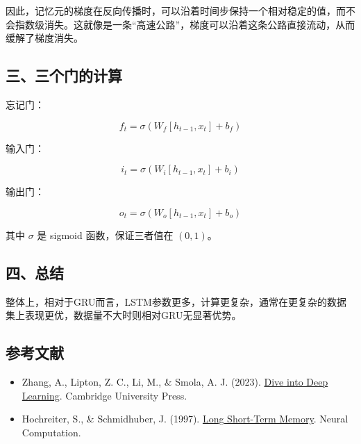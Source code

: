 因此，记忆元的梯度在反向传播时，可以沿着时间步保持一个相对稳定的值，而不会指数级消失。这就像是一条``高速公路''，梯度可以沿着这条公路直接流动，从而缓解了梯度消失。

\hypertarget{ux4e09ux4e09ux4e2aux95e8ux7684ux8ba1ux7b97}{%
\subsection{三、三个门的计算}\label{ux4e09ux4e09ux4e2aux95e8ux7684ux8ba1ux7b97}}

忘记门：

\[
f_t = \sigma(W_f [h_{t-1}, x_t] + b_f)
\]

输入门：

\[
i_t = \sigma(W_i [h_{t-1}, x_t] + b_i)
\]

输出门：

\[
o_t = \sigma(W_o [h_{t-1}, x_t] + b_o)
\]

其中 \(\sigma\) 是 sigmoid 函数，保证三者值在 \((0,1)\)。

\hypertarget{ux56dbux603bux7ed3}{%
\subsection{四、总结}\label{ux56dbux603bux7ed3}}

整体上，相对于GRU而言，LSTM参数更多，计算更复杂，通常在更复杂的数据集上表现更优，数据量不大时则相对GRU无显著优势。

\FloatBarrier
{}
\hypertarget{ux53c2ux8003ux6587ux732e-21}{%
\subsection{参考文献}\label{ux53c2ux8003ux6587ux732e-21}}

\vspace{0.25em}
\begin{itemize}
\tightlist
\item
  Zhang, A., Lipton, Z. C., Li, M., \& Smola, A. J. (2023). \href{https://D2L.ai}{Dive into Deep Learning}. Cambridge University Press.
\item
  Hochreiter, S., \& Schmidhuber, J. (1997). \href{https://doi.org/10.1162/neco.1997.9.8.1735}{Long Short-Term Memory}. Neural Computation.
\end{itemize}

\clearpage
